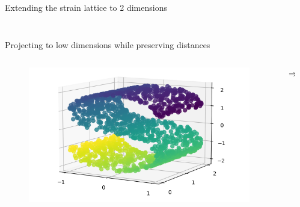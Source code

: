 \documentclass{beamer}
\begin{document}
\begin{frame}{Extending the strain lattice to 2 dimensions}
\begin{columns}
\begin{column}{0.5\textwidth}
\begin{figure}
            \end{figure}
        \end{column}
    \end{columns}
    \centering
    \vfill
    \tiny{\cite{gogDynamicsSelectionManystrain2002}}

\end{frame}
\begin{frame}{Projecting to low dimensions while preserving distances}
    \begin{columns}
        \begin{column}{0.4\textwidth}
            \begin{figure}
                \includegraphics[width=1.4\textwidth]{standalone/mds_1.png}
                
            \end{figure}   
        \end{column}
        \begin{column}{0.01\textwidth}
            \huge{$\Longrightarrow$}
            
        \end{column}
        \begin{column}{0.4\textwidth}
            
        \end{column}
    \end{columns}
    \centering
    \vfill
    \tiny{\cite{scikit-learn}}

\end{frame}
\end{document}
